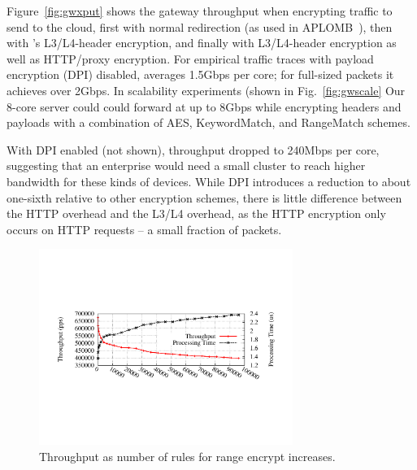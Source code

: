 Figure~\ref{fig:gwxput} shows the gateway throughput when encrypting traffic to send to the cloud, first with normal redirection (as used in APLOMB~\cite{aplomb}), then with \sys's L3/L4-header encryption, and finally with L3/L4-header encryption as well as HTTP/proxy encryption. 
For empirical traffic traces with payload encryption (DPI) disabled, \sys averages 1.5Gbps per core; for full-sized packets it achieves over 2Gbps.
In scalability experiments (shown in Fig.~\ref{fig:gwscale} Our 8-core server could could forward at up to 8Gbps while encrypting headers and payloads with a combination of AES, KeywordMatch, and RangeMatch schemes.

With DPI enabled (not shown), throughput dropped to 240Mbps per core, suggesting that an enterprise would need a small cluster to reach higher bandwidth for these kinds of devices.
While DPI introduces a reduction to about one-sixth relative to other encryption schemes, there is little difference between the HTTP overhead and the L3/L4 overhead, as the HTTP encryption only occurs on HTTP requests -- a small fraction of packets. 

\begin{figure}[t]
  \includegraphics[width=3.25in]{fig/xputrange}
  \caption[]{\label{fig:xputrange} Throughput as number of rules for range encrypt increases.}
\end{figure}

